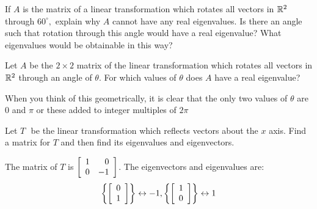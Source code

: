 \begin{enumialphparenastyle}

\begin{ex} If $A$ is the matrix of a linear transformation which rotates all
vectors in $\mathbb{R}^{2}$ through $60^{\circ },$ explain why $A$ cannot
have any real eigenvalues. Is there an angle such that rotation through this
angle would have a real eigenvalue? What eigenvalues would be obtainable in
this way? \vspace{1mm} 
\end{ex}


\begin{ex} Let $A$ be the $2\times 2$ matrix of the linear transformation which
rotates all vectors in $\mathbb{R}^{2}$ through an angle of $\theta $. For
which values of $\theta $ does $A$ have a real eigenvalue? 
\begin{sol}
When you think of this geometrically, it is clear that the only two values
of $\theta $ are 0 and $\pi $ or these added to integer multiples of $2\pi $
\end{sol}
\end{ex}


\begin{ex} Let $T\,$\ be the linear transformation which reflects vectors about
the $x$ axis. Find a matrix for $T$ and then find its eigenvalues and
eigenvectors. 
\begin{sol}
The matrix of $T$ is $\left[
\begin{array}{rr}
1 & 0 \\
0 & -1
\end{array}
\right]$. The eigenvectors and eigenvalues are:
\[
\left\{ \left[
\begin{array}{c}
0 \\
1
\end{array}
\right] \right\} \leftrightarrow -1,\left\{ \left[
\begin{array}{c}
1 \\
0
\end{array}
\right] \right\} \leftrightarrow 1
\]
\end{sol}
\end{ex}


\end{enumialphparenastyle}
